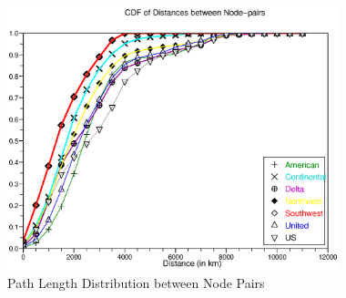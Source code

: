 \documentclass[10pt]{article}
\begin{document}
\begin{figure}[htp]
\begin{center}
\includegraphics[height=3in]{plcdf-colour}%
\end{center}
\caption{\label{fig:plcdf}Path Length Distribution between Node Pairs}
\end{figure}
\end{document}
